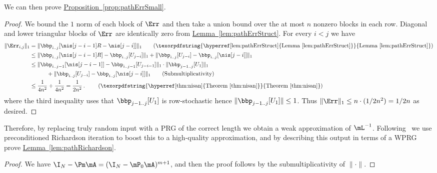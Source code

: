 \documentclass[11pt]{article}
\newcommand{\expref}[2]{\texorpdfstring{\hyperref[#2]{#1~\ref{#2}}}{#1~\ref{#2}}}
\begin{document}
We can then prove \expref{Proposition}{prop:pathErrSmall}.
\begin{proof}
We bound the $1$ norm of each block of $\Err$ and then take a union bound over the at most $n$ nonzero blocks in each row. Diagonal and lower triangular blocks of $\Err$ are identically zero from \expref{Lemma}{lem:pathErrStruct}. For every $i<j$ we have 
\begin{align*}
    \|\Err_{i,j}\|_1 &=\|\bbp_{i..j}[\nis[j-i-1]R-\nis[j-i]]\|_1
    \tag*{\text{(\expref{Lemma}{lem:pathErrStruct})}}\\
    &\leq \|\bbp_{i..j}[\nis[j-i-1]R] -\bbp_{i..j}[U_{j-i}]\|_1+\|\bbp_{i..j}[U_{j-i}]- \bbp_{i..j}[\nis[j-i]]\|_1  \\
    &\leq  \|\bbp_{i..j-1}[\nis[j-i-1]] -\bbp_{i..j-1}[U_{j-i-1}]\|_1\cdot\|\bbp_{j-1..j}[U_1]\|_1\\ 
%
%
%
%
%
    &\quad\quad\quad + \|\bbp_{i..j}[U_{j-i}]- \bbp_{i..j}[\nis[j-i]]\|_1 %
    \tag*{\text{(Submultiplicativity)}} \\
    &\leq \frac{1}{4n^2}+\frac{1}{4n^2} = \frac{1}{2n^2}\,. %
    \tag*{
%
       \text{(\expref{Theorem}{thm:nisan})}}%
\end{align*}
%
where %
the third inequality uses that $\bbp_{j-1..j}[U_1]$ is row-stochastic hence $\|\bbp_{j-1..j}[U_1]\|\leq 1$.
Thus $\|\Err\|_1 \leq n\cdot(1/2n^2)= 1/2n$ as desired.
\end{proof}

Therefore, by replacing truly random input with a PRG of the correct length we obtain a weak approximation of $\mL^{-1}$. Following~\cite{AhmadinejadKeMuPeSiVa19} we use preconditioned Richardson iteration to boost this to a %
high-quality  %
approximation, and by describing this output in terms of a WPRG prove \expref{Lemma}{lem:pathRichardson}.

\Richardson*
\begin{proof}
We have $\I_N-\Pm\mA= (\I_N-\mP_0\mA)^{m+1}$, and then the proof follows by the submultiplicativity of $\|\cdot\|$.
\end{proof}
\end{document}
